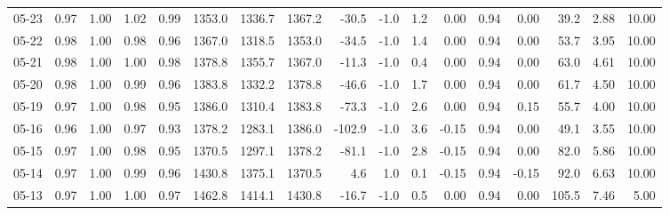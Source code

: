 \begin{threeparttable}
{\begin{tabular}{lrrrrrrrrrrrrrrrr}
  05-23 &         0.97 &           1.00 &          1.02 &          0.99 & 1353.0 & 1336.7 & 1367.2 &      -30.5 &                     -1.0 &                 1.2 &       0.00 &      0.94 &           0.00 &             39.2 &            2.88 &                  10.00 \\
  05-22 &         0.98 &           1.00 &          0.98 &          0.96 & 1367.0 & 1318.5 & 1353.0 &      -34.5 &                     -1.0 &                 1.4 &       0.00 &      0.94 &           0.00 &             53.7 &            3.95 &                  10.00 \\
  05-21 &         0.98 &           1.00 &          1.00 &          0.98 & 1378.8 & 1355.7 & 1367.0 &      -11.3 &                     -1.0 &                 0.4 &       0.00 &      0.94 &           0.00 &             63.0 &            4.61 &                  10.00 \\
  05-20 &         0.98 &           1.00 &          0.99 &          0.96 & 1383.8 & 1332.2 & 1378.8 &      -46.6 &                     -1.0 &                 1.7 &       0.00 &      0.94 &           0.00 &             61.7 &            4.50 &                  10.00 \\
  05-19 &         0.97 &           1.00 &          0.98 &          0.95 & 1386.0 & 1310.4 & 1383.8 &      -73.3 &                     -1.0 &                 2.6 &       0.00 &      0.94 &           0.15 &             55.7 &            4.00 &                  10.00 \\
  05-16 &         0.96 &           1.00 &          0.97 &          0.93 & 1378.2 & 1283.1 & 1386.0 &     -102.9 &                     -1.0 &                 3.6 &      -0.15 &      0.94 &           0.00 &             49.1 &            3.55 &                  10.00 \\
  05-15 &         0.97 &           1.00 &          0.98 &          0.95 & 1370.5 & 1297.1 & 1378.2 &      -81.1 &                     -1.0 &                 2.8 &      -0.15 &      0.94 &           0.00 &             82.0 &            5.86 &                  10.00 \\
  05-14 &         0.97 &           1.00 &          0.99 &          0.96 & 1430.8 & 1375.1 & 1370.5 &        4.6 &                      1.0 &                 0.1 &      -0.15 &      0.94 &          -0.15 &             92.0 &            6.63 &                  10.00 \\
  05-13 &         0.97 &           1.00 &          1.00 &          0.97 & 1462.8 & 1414.1 & 1430.8 &      -16.7 &                     -1.0 &                 0.5 &       0.00 &      0.94 &           0.00 &            105.5 &            7.46 &                   5.00 \\

\end{tabular}}
\end{threeparttable}
